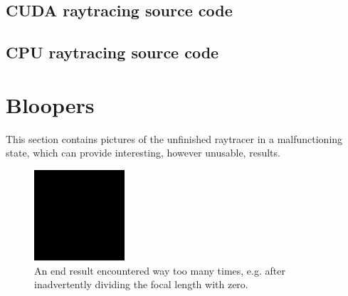 \documentclass[journal]{IEEEtran}
\begin{document}
\subsection{CUDA raytracing source code}




\subsection{CPU raytracing source code}






\clearpage







\section{Bloopers}
This section contains pictures of the unfinished raytracer in a malfunctioning state, which can provide interesting, however unusable, results.

\begin{figure}[!h]
\centering
\includegraphics[width=0.30\textwidth]{bloopers/black.png}
\caption{An end result encountered way too many times, e.g. after inadvertently dividing the focal length with zero.}
\label{fig:black}
\end{figure}
\end{document}
